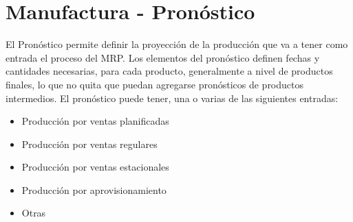 \documentclass[letterpaper,10pt,spanish]{sphinxmanual}
\begin{document}
\section{Manufactura - Pronóstico}
\label{manufactura-pronostico:manufactura-pronostico}\label{manufactura-pronostico::doc}
El Pronóstico permite definir la proyección de la producción que va a tener como entrada el proceso del MRP. Los elementos del pronóstico definen fechas y cantidades necesarias, para cada producto, generalmente a nivel de productos finales, lo que no quita que puedan agregarse pronósticos de productos intermedios. El pronóstico puede tener, una o varias de las siguientes entradas:
\begin{itemize}
\item {} 
Producción por ventas planificadas

\item {} 
Producción por ventas regulares

\item {} 
Producción por ventas estacionales

\item {} 
Producción por aprovisionamiento

\item {} 
Otras

\end{itemize}
\end{document}
